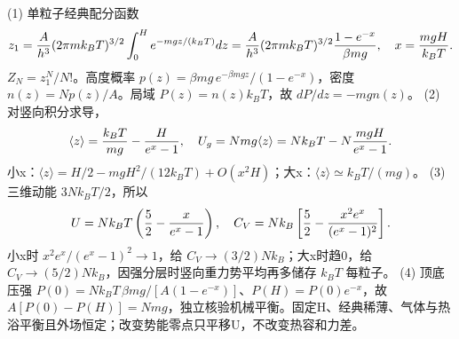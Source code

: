 (1) 单粒子经典配分函数
\[
z_1={A\over h^3}(2\pi mk_BT)^{3/2}\int_0^H e^{-mgz/(k_BT)}dz
={A\over h^3}(2\pi mk_BT)^{3/2}{1-e^{-x}\over\beta mg},
\quad x={mgH\over k_BT}.
\]
\(Z_N=z_1^N/N!\)。高度概率 \(p(z)=\beta mg\,e^{-\beta mgz}/(1-e^{-x})\)，密度 \(n(z)=Np(z)/A\)。局域 \(P(z)=n(z)k_BT\)，故 \(dP/dz=-mgn(z)\)。
(2) 对竖向积分求导，
\[
\langle z\rangle={k_BT\over mg}-{H\over e^x-1},\quad
U_g=Nmg\langle z\rangle=Nk_BT-N{mgH\over e^x-1}.
\]
小x：\(\langle z\rangle=H/2-mgH^2/(12k_BT)+O(x^2H)\)；大x：\(\langle z\rangle\simeq k_BT/(mg)\)。
(3) 三维动能 \(3Nk_BT/2\)，所以
\[
U=Nk_BT\left({5\over2}-{x\over e^x-1}\right),
\quad C_V=Nk_B\left[{5\over2}-{x^2e^x\over(e^x-1)^2}\right].
\]
小x时 \(x^2e^x/(e^x-1)^2\to1\)，给 \(C_V\to(3/2)Nk_B\)；大x时趋0，给 \(C_V\to(5/2)Nk_B\)，因强分层时竖向重力势平均再多储存 \(k_BT\) 每粒子。
(4) 顶底压强 \(P(0)=Nk_BT\,\beta mg/[A(1-e^{-x})]\)、\(P(H)=P(0)e^{-x}\)，故 \(A[P(0)-P(H)]=Nmg\)，独立核验机械平衡。固定H、经典稀薄、气体与热浴平衡且外场恒定；改变势能零点只平移U，不改变热容和力差。
